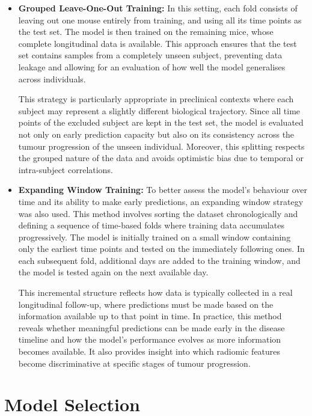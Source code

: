 \documentclass[12pt, a4paper]{report}
\begin{document}
\begin{itemize}
    \item \textbf{Grouped Leave-One-Out Training:} In this setting, each fold consists of leaving out one mouse entirely from training, and using all its time points as the test set. The model is then trained on the remaining mice, whose complete longitudinal data is available. This approach ensures that the test set contains samples from a completely unseen subject, preventing data leakage and allowing for an evaluation of how well the model generalises across individuals.

    This strategy is particularly appropriate in preclinical contexts where each subject may represent a slightly different biological trajectory. Since all time points of the excluded subject are kept in the test set, the model is evaluated not only on early prediction capacity but also on its consistency across the tumour progression of the unseen individual. Moreover, this splitting respects the grouped nature of the data and avoids optimistic bias due to temporal or intra-subject correlations.
    
    \item \textbf{Expanding Window Training:} To better assess the model’s behaviour over time and its ability to make early predictions, an expanding window strategy was also used. This method involves sorting the dataset chronologically and defining a sequence of time-based folds where training data accumulates progressively. The model is initially trained on a small window containing only the earliest time points and tested on the immediately following ones. In each subsequent fold, additional days are added to the training window, and the model is tested again on the next available day.

    This incremental structure reflects how data is typically collected in a real longitudinal follow-up, where predictions must be made based on the information available up to that point in time. In practice, this method reveals whether meaningful predictions can be made early in the disease timeline and how the model’s performance evolves as more information becomes available. It also provides insight into which radiomic features become discriminative at specific stages of tumour progression.

\end{itemize}

\section{Model Selection}
\end{document}
